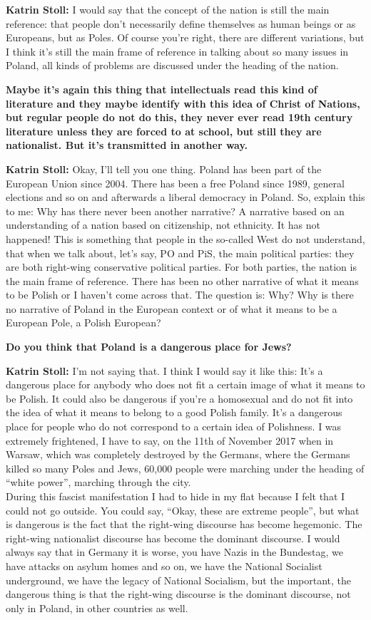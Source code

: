 \textbf{Katrin Stoll:} I would say that the concept of the nation is still the main reference: that people don’t necessarily define themselves as human beings or as Europeans, but as Poles. Of course you're right, there are different variations, but I think it’s still the main frame of reference in talking about so many issues in Poland, all kinds of problems are discussed under the heading of the nation. 

\textbf{Maybe it’s again this thing that intellectuals read this kind of literature and they maybe identify with this idea of Christ of Nations, but regular people do not do this, they never ever read 19th century literature unless they are forced to at school, but still they are nationalist. But it’s transmitted in another way.} 

\textbf{Katrin Stoll:} Okay, I’ll tell you one thing. Poland has been part of the European Union since 2004. There has been a free Poland since 1989, general elections and so on and afterwards a liberal democracy in Poland. So, explain this to me: Why has there never been another narrative? A narrative based on an understanding of a nation based on citizenship, not ethnicity. It has not happened! This is something that people in the so-called West do not understand, that when we talk about, let’s say, PO and PiS, the main political parties: they are both right-wing conservative political parties. For both parties, the nation is the main frame of reference. There has been no other narrative of what it means to be Polish or I haven’t come across that. The question is: Why? Why is there no narrative of Poland in the European context or of what it means to be a European Pole, a Polish European? 

\textbf{Do you think that Poland is a dangerous place for Jews?}  
 
\textbf{Katrin Stoll:} I’m not saying that. I think I would say it like this: It’s a dangerous place for anybody who does not fit a certain image of what it means to be Polish. It could also be dangerous if you’re a homosexual and do not fit into the idea of what it means to belong to a good Polish family. It’s a dangerous place for people who do not correspond to a certain idea of Polishness. I was extremely frightened, I have to say, on the 11th of November 2017 when in Warsaw, which was completely destroyed by the Germans, where the Germans killed so many Poles and Jews, 60,000 people were marching under the heading of ``white power'', marching through the city.\\
During this fascist manifestation I had to hide in my flat because I felt that I could not go outside. You could say, ``Okay, these are extreme people'', but what is dangerous is the fact that the right-wing discourse has become hegemonic. The right-wing nationalist discourse has become the dominant discourse. I would always say that in Germany it is worse, you have Nazis in the Bundestag, we have attacks on asylum homes and so on, we have the National Socialist underground, we have the legacy of National Socialism, but the important, the dangerous thing is that the right-wing discourse is the dominant discourse, not only in Poland, in other countries as well.  

